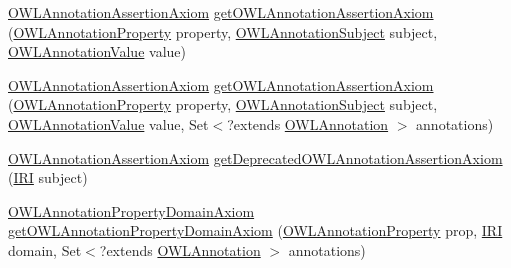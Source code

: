 \begin{DoxyCompactItemize}
\item 
\hyperlink{interfaceorg_1_1semanticweb_1_1owlapi_1_1model_1_1_o_w_l_annotation_assertion_axiom}{O\-W\-L\-Annotation\-Assertion\-Axiom} \hyperlink{classuk_1_1ac_1_1manchester_1_1cs_1_1owl_1_1owlapi_1_1_o_w_l_data_factory_impl_acc4d5d7452fbb213e3c8e7cef9cf8f10}{get\-O\-W\-L\-Annotation\-Assertion\-Axiom} (\hyperlink{interfaceorg_1_1semanticweb_1_1owlapi_1_1model_1_1_o_w_l_annotation_property}{O\-W\-L\-Annotation\-Property} property, \hyperlink{interfaceorg_1_1semanticweb_1_1owlapi_1_1model_1_1_o_w_l_annotation_subject}{O\-W\-L\-Annotation\-Subject} subject, \hyperlink{interfaceorg_1_1semanticweb_1_1owlapi_1_1model_1_1_o_w_l_annotation_value}{O\-W\-L\-Annotation\-Value} value)
\item 
\hyperlink{interfaceorg_1_1semanticweb_1_1owlapi_1_1model_1_1_o_w_l_annotation_assertion_axiom}{O\-W\-L\-Annotation\-Assertion\-Axiom} \hyperlink{classuk_1_1ac_1_1manchester_1_1cs_1_1owl_1_1owlapi_1_1_o_w_l_data_factory_impl_a3d093bebe6220241821f62feefa269a1}{get\-O\-W\-L\-Annotation\-Assertion\-Axiom} (\hyperlink{interfaceorg_1_1semanticweb_1_1owlapi_1_1model_1_1_o_w_l_annotation_property}{O\-W\-L\-Annotation\-Property} property, \hyperlink{interfaceorg_1_1semanticweb_1_1owlapi_1_1model_1_1_o_w_l_annotation_subject}{O\-W\-L\-Annotation\-Subject} subject, \hyperlink{interfaceorg_1_1semanticweb_1_1owlapi_1_1model_1_1_o_w_l_annotation_value}{O\-W\-L\-Annotation\-Value} value, Set$<$?extends \hyperlink{interfaceorg_1_1semanticweb_1_1owlapi_1_1model_1_1_o_w_l_annotation}{O\-W\-L\-Annotation} $>$ annotations)
\item 
\hyperlink{interfaceorg_1_1semanticweb_1_1owlapi_1_1model_1_1_o_w_l_annotation_assertion_axiom}{O\-W\-L\-Annotation\-Assertion\-Axiom} \hyperlink{classuk_1_1ac_1_1manchester_1_1cs_1_1owl_1_1owlapi_1_1_o_w_l_data_factory_impl_a7233c7375aabefb949a88eef7109818c}{get\-Deprecated\-O\-W\-L\-Annotation\-Assertion\-Axiom} (\hyperlink{classorg_1_1semanticweb_1_1owlapi_1_1model_1_1_i_r_i}{I\-R\-I} subject)
\item 
\hyperlink{interfaceorg_1_1semanticweb_1_1owlapi_1_1model_1_1_o_w_l_annotation_property_domain_axiom}{O\-W\-L\-Annotation\-Property\-Domain\-Axiom} \hyperlink{classuk_1_1ac_1_1manchester_1_1cs_1_1owl_1_1owlapi_1_1_o_w_l_data_factory_impl_ae0aa695370bd884bd2d38b5f8b7bfe7a}{get\-O\-W\-L\-Annotation\-Property\-Domain\-Axiom} (\hyperlink{interfaceorg_1_1semanticweb_1_1owlapi_1_1model_1_1_o_w_l_annotation_property}{O\-W\-L\-Annotation\-Property} prop, \hyperlink{classorg_1_1semanticweb_1_1owlapi_1_1model_1_1_i_r_i}{I\-R\-I} domain, Set$<$?extends \hyperlink{interfaceorg_1_1semanticweb_1_1owlapi_1_1model_1_1_o_w_l_annotation}{O\-W\-L\-Annotation} $>$ annotations)

\end{DoxyCompactItemize}
